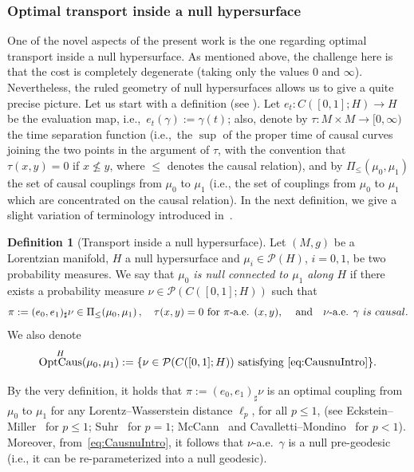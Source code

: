 \documentclass[12pt,a4paper]{amsart}
\theoremstyle{plain}
\theoremstyle{definition}
\newtheorem{definition}[lemma]{Definition}
\numberwithin{equation}{section}
\DeclareMathOperator{\OptCaus}{OptCaus}
\newcommand{\Prob}{\mathcal P}
\begin{document}
\subsubsection*{\textbf{Optimal transport inside a null hypersurface}}
One of the novel aspects of the present work is the one regarding optimal transport inside a null hypersurface. As mentioned above, the challenge here is that the cost is completely degenerate (taking only the values $0$ and $\infty$). Nevertheless, the ruled geometry of null hypersurfaces allows us to give a quite precise picture. Let us start with a definition (see ). Let $e_t: C([0,1]; H)\to H$ be the evaluation map, i.e.,\ $e_t(\gamma):=\gamma(t)$; also, denote by $\tau:M\times M\to [0,\infty)$ the time separation function (i.e.,\ the $\sup$ of the proper time of causal curves joining the two points in the argument of $\tau$, with the convention that $\tau(x,y)=0$ if $x\not\leq y$, where $\leq$ denotes the causal relation), and by $\Pi_\leq(\mu_0, \mu_1)$ the set of causal couplings from $\mu_0$ to $\mu_1$ (i.e., the set of couplings  from $\mu_0$ to $\mu_1$ which are concentrated on the causal relation). In the next definition, we give a slight variation of terminology introduced in~\cite{Ket24}.


\begin{definition}[Transport inside a null hypersurface]
  \label{defn:insideIntro}
 Let $(M,g)$ be a Lorentzian manifold, $H$ a null hypersurface and $\mu_i\in\Prob(H)$, $i=0,1$, be
  two probability measures.
  We say that \emph{$\mu_0$ is null connected to $\mu_1$ along $H$}  if there
  exists a probability measure  $\nu \in \mathcal{P}(C([0,1];H ))$  such that
  \begin{equation}\label{eq:CausnuIntro}
  \pi:=(e_{0},e_{1})_{\sharp} \nu\in \Pi_{\leq}(\mu_0, \mu_1)\,,\quad \tau(x,y)=0 \text{ for $\pi$-a.e. $(x,y)$, }\quad \text{and}\quad \nu\text{-a.e. } \gamma {\rm\ is \ causal}.
  \end{equation}
  We also denote
  \begin{equation}\label{def:OptCausIntro}
\OptCaus^H(\mu_0,\mu_1) := \{ \nu \in \mathcal{P}(C([0,1];H )) \text{ satisfying~\eqref{eq:CausnuIntro}}\}.
\end{equation}
\end{definition}
By the very definition, it holds that $\pi:=(e_{0},e_{1})_{\sharp}
\nu$ is an optimal coupling from $\mu_0$ to $\mu_1$ for  any
Lorentz--Wasserstein distance $\ell_p$, for all $p\leq 1$, (see
Eckstein--Miller~\cite{EM17} for $p\leq 1$; Suhr~\cite{Suhr} for $p=1$;
McCann~\cite{McCann} and Cavalletti--Mondino~\cite{CaMo:20} for
$p<1$). Moreover, from~\eqref{eq:CausnuIntro}, it follows that
$\nu$-a.e.\ $\gamma$ is a null pre-geodesic (i.e., it can be re-parameterized into a null geodesic).
\end{document}
